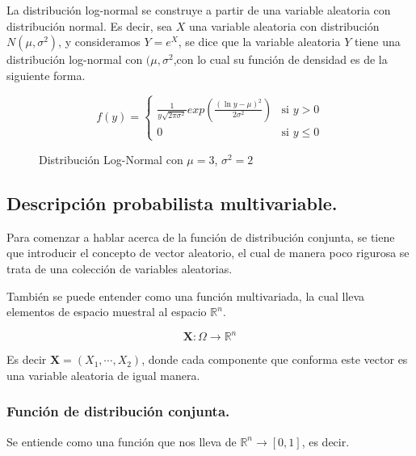 La distribución log-normal  se construye a partir de una variable aleatoria con distribución normal. Es decir, sea $X$ una variable aleatoria con distribución $N(\mu,\sigma^2)$, y consideramos $Y = e^X$, se dice que la variable aleatoria $Y$ tiene una distribución log-normal con $(\mu,\sigma^2$,con lo cual su función de densidad es de la siguiente forma.

\begin{equation}
	f(y) = 
	\begin{cases}
		\frac{1}{y\sqrt{2\pi\sigma^2}} exp\left( \frac{(\ln y-\mu)^2}{2\sigma^2}\right) & \text{si } y > 0\\
		0 & \text{si } y\leq 0
	\end{cases}
\end{equation}

\begin{figure}[!ht]
    \centering
    \scalebox{1}{}
    \caption{Distribución Log-Normal con $\mu = 3$, $\sigma^2 = 2$\protect\footnotemark}
    \label{fig:DisLogNormal}
\end{figure}

\subsection{Descripción probabilista multivariable.}
Para comenzar a hablar acerca de la función de distribución conjunta, se tiene que introducir el concepto de vector aleatorio, el cual de manera poco rigurosa se trata de una colección de variables aleatorias. 

También se puede entender como una función multivariada, la cual lleva elementos de espacio muestral al espacio $\mathbb{R}^n$.

\begin{equation}
	\mathbf{X} : \Omega \to \mathbb{R}^n
\end{equation}

Es decir $\mathbf{X} = (X_1,\cdots, X_2)$, donde cada componente que conforma este vector es una variable aleatoria de igual manera.

\subsubsection{Función de distribución conjunta.}

Se entiende como una función que nos lleva de $\mathbb{R}^n \to [0,1]$, es decir.

